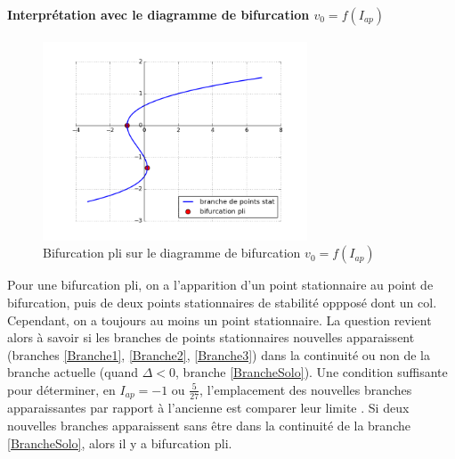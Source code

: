 \documentclass[12pt,a4paper,onecolumn]{article}
\begin{document}
\paragraph{Interprétation avec le diagramme de bifurcation \texorpdfstring{$v_0=f(I_{ap})$}{Lg}}
\begin{figure}[H]
\begin{center}
\includegraphics[origin =c, width = 0.7\textwidth]{bifpli.png}
\end{center}
\caption{Bifurcation pli sur le diagramme de bifurcation $v_0=f(I_{ap})$}
\end{figure}
Pour une bifurcation pli, on a l'apparition d'un point stationnaire au point de bifurcation, puis de deux points stationnaires de stabilité oppposé dont un col. Cependant, on a toujours au moins un point stationnaire. La question revient alors à savoir si les branches de points stationnaires nouvelles apparaissent (branches \ref{Branche1}, \ref{Branche2}, \ref{Branche3}) dans la continuité ou non de la branche actuelle (quand $\Delta < 0$, branche \ref{BrancheSolo}). Une condition suffisante pour déterminer, en $I_{ap} = -1$ ou $\frac{5}{27}$, l'emplacement des nouvelles branches apparaissantes par rapport à l'ancienne est comparer leur limite . Si deux nouvelles branches apparaissent sans être dans la continuité de la branche \ref{BrancheSolo}, alors il y a bifurcation pli.

\end{document}
